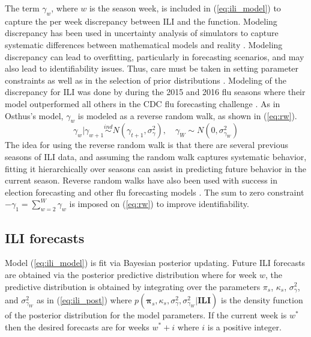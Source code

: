 \documentclass[ba]{imsart}
\theoremstyle{plain}
\theoremstyle{definition}
\theoremstyle{remark}
\begin{document}
The term $\gamma_w$, where $w$ is the season week, is included in (\ref{eq:ili_model}) to capture the per week discrepancy between ILI and the function. Modeling discrepancy has been used in uncertainty analysis of simulators to capture systematic differences between mathematical models and 
reality \cite[]{ma2022multifidelity,brynjarsdottir2014learning,arendt2012improving,kennedy2001bayesian}. Modeling discrepancy can lead to overfitting, particularly in forecasting scenarios, and may also lead to identifiability issues. 
Thus, care must be taken in setting parameter constraints as well as in the selection of prior distributions \cite[]{osthus2019dynamic,brynjarsdottir2014learning}. 
Modeling of the discrepancy for ILI was done by \cite{osthus2019dynamic} during the 2015 and 2016 flu seasons where their model outperformed all others in the CDC flu forecasting challenge \cite[]{osthus2019dynamic}. As in Osthus's model, $\gamma_w$ is modeled as a reverse random walk, as shown in (\ref{eq:rw}). 
\begin{equation}
    \label{eq:rw}
        \gamma_w|\gamma_{w + 1} \overset{ind}{\sim} N(\gamma_{t+1},\sigma^2_{\gamma}), \quad
        \gamma_{W} \sim N(0,\sigma^2_{\gamma_W})
\end{equation}
The idea for using the reverse random walk is that there are several previous seasons of ILI data, and assuming the random walk captures systematic behavior, fitting it hierarchically over seasons can assist in predicting future behavior in the current season. 
Reverse random walks have also been used with success in election forecasting and other flu forecasting models \cite[]{osthus2021multiscale, osthus2019dynamic, linzer2013dynamic}. The sum to zero constraint $-\gamma_1 = \sum_{w=2}^W \gamma_w$ is imposed on (\ref{eq:rw}) to improve identifiability. 



\subsection{ILI forecasts}
Model (\ref{eq:ili_model}) is fit via Bayesian posterior updating. Future ILI forecasts are obtained via the posterior predictive distribution where for week $w$, the predictive distribution is obtained by integrating over the parameters $\pi_s$, $\kappa_s$, $\sigma^2_{\gamma}$, and $\sigma^2_{\gamma_W}$ as in (\ref{eq:ili_post}) where $p(\boldsymbol{\pi}_s, \kappa_s, \sigma^2_{\gamma}, \sigma^2_{\gamma_W} | \textbf{ILI})$ is the density function of the posterior distribution for the model parameters. If the current week is $w^*$ then the desired forecasts are for weeks $w^* + i$ where $i$ is a positive integer.
\end{document}
